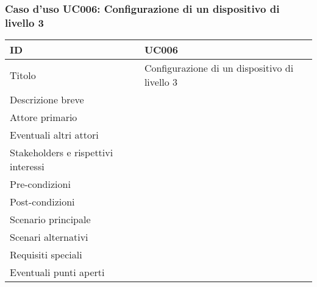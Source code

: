 \documentclass[../../main.tex]{subfiles}
\begin{document}
\subsubsection{Caso d’uso UC006: Configurazione di un dispositivo di livello 3 }
\begin{tabularx}{150mm}{|l|X|}
    \hline
    ID                                  & \textbf{UC006}\\
    \hline
    Titolo                              & Configurazione di un dispositivo di livello 3 \\
    \hline
    Descrizione breve                   &    \\
    \hline
    Attore primario                     &    \\
    \hline
    Eventuali altri attori              &    \\
    \hline
    Stakeholders e rispettivi interessi &    \\
    \hline
    Pre-condizioni                      &    \\
    \hline
    Post-condizioni                     &    \\
    \hline
    Scenario principale                 &    \\
    \hline
    Scenari alternativi                 &    \\
    \hline
    Requisiti speciali                  &    \\
    \hline
    Eventuali punti aperti              &    \\
    \hline
\end{tabularx}
\newpage
\end{document}
